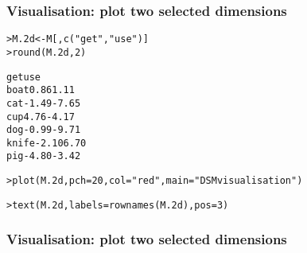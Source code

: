 \begin{frame}[fragile]
  \frametitle{Visualisation: plot two selected dimensions}

\ungap
\begin{alltt}\small
> M.2d <- M[, c("get", "use")]
> round(M.2d, 2) \begin{Rout}
          get   use
  boat   0.86  1.11
  cat   -1.49 -7.65
  cup    4.76 -4.17
  dog   -0.99 -9.71
  knife -2.10  6.70
  pig   -4.80 -3.42 \end{Rout}

> plot(M.2d, pch=20, col="red", main="DSM visualisation")

> text(M.2d, labels=rownames(M.2d), pos=3)
\end{alltt}
\end{frame}

\begin{frame}
  \frametitle{Visualisation: plot two selected dimensions}

  \ungap[2]
  \begin{center}
  \end{center}
\end{frame}

